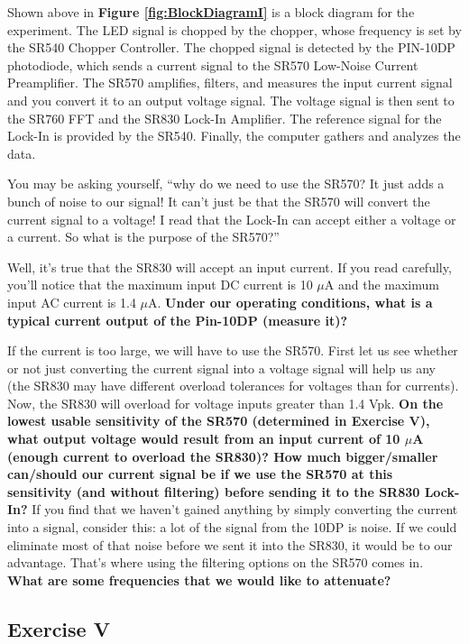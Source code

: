 \documentclass{../lab}
\begin{document}
Shown above in \textbf{Figure \ref{fig:BlockDiagramI}} is a block diagram for the experiment. The LED signal is chopped by the chopper, whose frequency is set by the SR540 Chopper Controller. The chopped signal is detected by the PIN-10DP photodiode, which sends a current signal to the SR570 Low-Noise Current Preamplifier. The SR570 amplifies, filters, and measures the input current signal and you convert it to an output voltage signal. The voltage signal is then sent to the SR760 FFT and the SR830 Lock-In Amplifier. The reference signal for the Lock-In is provided by the SR540. Finally, the computer gathers and analyzes the data.

You may be asking yourself, ``why do we need to use the SR570? It just adds a bunch of noise to our signal! It can't just be that the SR570 will convert the current signal to a voltage! I read that the Lock-In can accept either a voltage or a current. So what is the purpose of the SR570?''

Well, it's true that the SR830 will accept an input current. If you read carefully, you'll notice that the maximum input DC current is 10 $\mu$A and the maximum input AC current is 1.4 $\mu$A. \textbf{Under our operating conditions, what is a typical current output of the Pin-10DP (measure it)?}

If the current is too large, we will have to use the SR570. First let us see whether or not just converting the current signal into a voltage signal will help us any (the SR830 may have different overload tolerances for voltages than for currents). Now, the SR830 will overload for voltage inputs greater than 1.4 Vpk. \textbf{On the lowest usable sensitivity of the SR570 (determined in Exercise V), what output voltage would result from an input current of 10 $\mu$A (enough current to overload the SR830)? How much bigger/smaller can/should our current signal be if we use the SR570 at this sensitivity (and without filtering) before sending it to the SR830 Lock-In?} If you find that we haven't gained anything by simply converting the current into a signal, consider this: a lot of the signal from the 10DP is noise. If we could eliminate most of that noise before we sent it into the SR830, it would be to our advantage. That's where using the filtering options on the SR570 comes in. \textbf{What are some frequencies that we would like to attenuate?}

\subsection{Exercise V}
\end{document}
